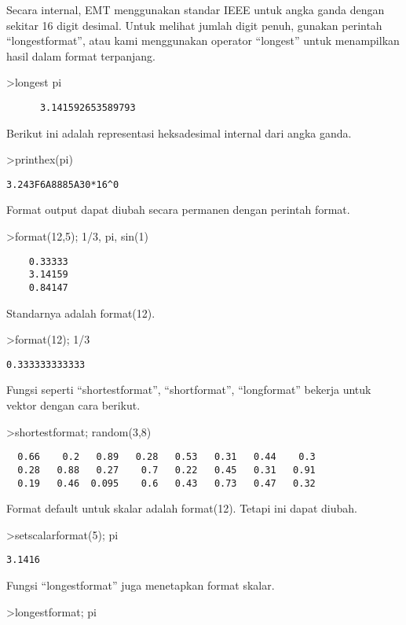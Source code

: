 \documentclass[
]{book}
\begin{document}
Secara internal, EMT menggunakan standar IEEE untuk angka ganda dengan sekitar 16 digit desimal. Untuk melihat jumlah digit penuh, gunakan perintah ``longestformat'', atau kami menggunakan operator ``longest'' untuk menampilkan hasil dalam format terpanjang.

\textgreater longest pi

\begin{verbatim}
      3.141592653589793 
\end{verbatim}

Berikut ini adalah representasi heksadesimal internal dari angka ganda.

\textgreater printhex(pi)

\begin{verbatim}
3.243F6A8885A30*16^0
\end{verbatim}

Format output dapat diubah secara permanen dengan perintah format.

\textgreater format(12,5); 1/3, pi, sin(1)

\begin{verbatim}
    0.33333 
    3.14159 
    0.84147 
\end{verbatim}

Standarnya adalah format(12).

\textgreater format(12); 1/3

\begin{verbatim}
0.333333333333
\end{verbatim}

Fungsi seperti ``shortestformat'', ``shortformat'', ``longformat'' bekerja untuk vektor dengan cara berikut.

\textgreater shortestformat; random(3,8)

\begin{verbatim}
  0.66    0.2   0.89   0.28   0.53   0.31   0.44    0.3 
  0.28   0.88   0.27    0.7   0.22   0.45   0.31   0.91 
  0.19   0.46  0.095    0.6   0.43   0.73   0.47   0.32 
\end{verbatim}

Format default untuk skalar adalah format(12). Tetapi ini dapat diubah.

\textgreater setscalarformat(5); pi

\begin{verbatim}
3.1416
\end{verbatim}

Fungsi ``longestformat'' juga menetapkan format skalar.

\textgreater longestformat; pi
\end{document}
